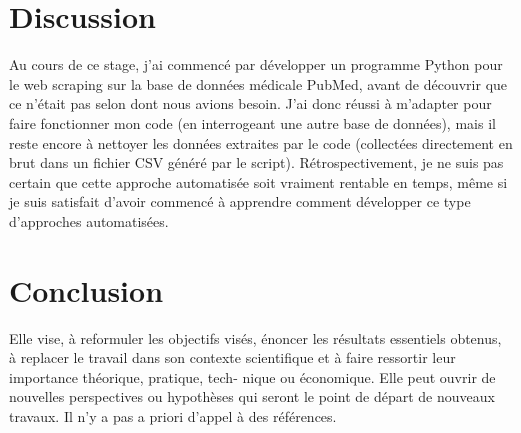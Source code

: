 \documentclass{book}
\begin{document}
\chapter{\label{Quatrième Chapitre}Discussion}
\noindent
Au cours de ce stage, j'ai commencé par développer un programme Python pour le
web scraping sur la base de données médicale PubMed, avant de découvrir que ce
n'était pas selon dont nous avions besoin. J'ai donc réussi à m'adapter pour
faire fonctionner mon code (en interrogeant une autre base de données), mais il
reste encore à nettoyer les données extraites par le code (collectées
directement en brut dans un fichier CSV généré par le script).
Rétrospectivement, je ne suis pas certain que cette approche automatisée soit
vraiment rentable en temps, même si je suis satisfait d'avoir commencé à
apprendre comment développer ce type d'approches automatisées.

\lipsum[1]

\thispagestyle{fancy}

\chapter{\label{Cinquième Chapitre}Conclusion}
Elle vise, à reformuler les objectifs visés, énoncer les résultats essentiels
obtenus, à replacer le
travail dans son contexte scientifique et à faire ressortir leur importance
théorique, pratique, tech-
nique ou économique. Elle peut ouvrir de nouvelles perspectives ou hypothèses
qui seront le point
de départ de nouveaux travaux. Il n'y a pas a priori d'appel à des références.

\thispagestyle{fancy}

\newpage


\thispagestyle{fancy}


\newpage
\thispagestyle{empty}
\mbox{} %
\end{document}
